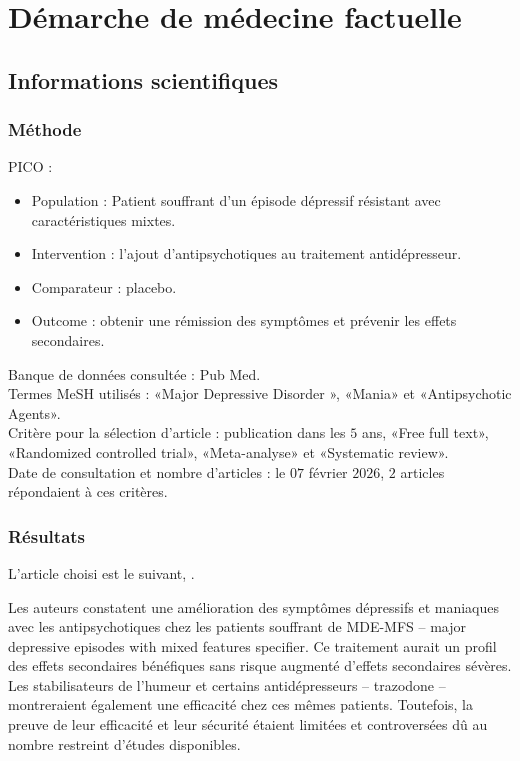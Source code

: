 \section{Démarche de médecine factuelle}

\subsection{Informations scientifiques}
  
\subsubsection{Méthode}

PICO :
\begin{itemize}[label=\textbullet]
    \item Population : Patient souffrant d’un épisode dépressif résistant avec caractéristiques mixtes. 
    \item Intervention : l’ajout d’antipsychotiques au traitement antidépresseur. 
    \item Comparateur : placebo. 
    \item Outcome : obtenir une rémission des symptômes et prévenir les effets secondaires. 
\end{itemize}

Banque de données consultée : Pub Med.\\ 
Termes MeSH utilisés : «Major Depressive Disorder », «Mania» et «Antipsychotic Agents».\\
Critère pour la sélection d’article : publication dans les $5$ ans, «Free full text», «Randomized controlled trial», «Meta-analyse» et «Systematic review».\\
Date de consultation et nombre d’articles : le $07$ février $2026$, $2$ articles répondaient à ces critères. 

\subsubsection{Résultats}  

L'article choisi est le suivant, \textcite{gao2025efficacy}.
 
Les auteurs constatent une amélioration des symptômes dépressifs et maniaques avec les antipsychotiques chez les patients souffrant de MDE-MFS -- major depressive episodes with mixed features specifier. Ce traitement aurait un profil des effets secondaires bénéfiques sans risque augmenté d’effets secondaires sévères. Les stabilisateurs de l’humeur et certains antidépresseurs -- trazodone -- montreraient également une efficacité chez ces mêmes patients. Toutefois, la preuve de leur efficacité et leur sécurité étaient limitées et controversées dû au nombre restreint d’études disponibles.

